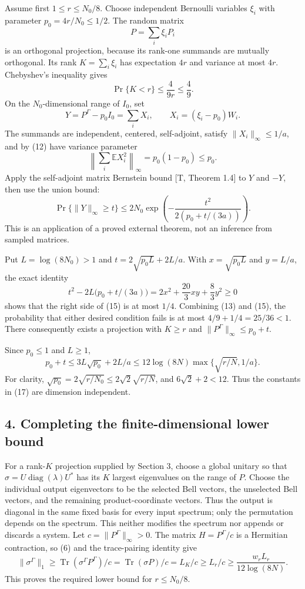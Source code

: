 \documentclass[11pt]{article}
\begin{document}
Assume first \(1\le r\le N_0/8\). Choose independent Bernoulli variables \(\xi_i\) with parameter \(p_0=4r/N_0\le1/2\). The random matrix \[
 P=\sum_i\xi_iP_i
\] is an orthogonal projection, because its rank-one summands are mutually orthogonal. Its rank \(K=\sum_i\xi_i\) has expectation \(4r\) and variance at most \(4r\). Chebyshev's inequality gives \[
 \Pr\{K<r\}\le\frac4{9r}\le\frac49.
 \tag{13}
\] On the \(N_0\)-dimensional range of \(I_0\), set \[
 Y=P^\Gamma-p_0I_0=\sum_iX_i,\qquad X_i=(\xi_i-p_0)W_i.
\] The summands are independent, centered, self-adjoint, satisfy \(\|X_i\|_\infty\le1/a\), and by (12) have variance parameter \[
 \left\|\sum_i\mathbb E X_i^2\right\|_\infty
 =p_0(1-p_0)\le p_0.
 \tag{14}
\] Apply the self-adjoint matrix Bernstein bound {[}T, Theorem 1.4{]} to \(Y\) and \(-Y\), then use the union bound: \[
 \Pr\{\|Y\|_\infty\ge t\}
 \le 2N_0\exp\left(-\frac{t^2}{2(p_0+t/(3a))}\right).
 \tag{15}
\] This is an application of a proved external theorem, not an inference from sampled matrices.

Put \(L=\log(8N_0)>1\) and \(t=2\sqrt{p_0L}+2L/a\). With \(x=\sqrt{p_0L}\) and \(y=L/a\), the exact identity \[
 t^2-2L\bigl(p_0+t/(3a)\bigr)
 =2x^2+\frac{20}3xy+\frac83y^2\ge0
 \tag{16}
\] shows that the right side of (15) is at most \(1/4\). Combining (13) and (15), the probability that either desired condition fails is at most \(4/9+1/4=25/36<1\). There consequently exists a projection with \(K\ge r\) and \(\|P^\Gamma\|_\infty\le p_0+t\).

Since \(p_0\le1\) and \(L\ge1\), \[
 p_0+t\le 3L\sqrt{p_0}+2L/a
 \le 12\log(8N)\max\{\sqrt{r/N},1/a\}.
 \tag{17}
\] For clarity, \(\sqrt{p_0}=2\sqrt{r/N_0}\le2\sqrt2\sqrt{r/N}\), and \(6\sqrt2+2<12\). Thus the constants in (17) are dimension independent.

\hypertarget{completing-the-finite-dimensional-lower-bound}{%
\subsection{4. Completing the finite-dimensional lower bound}\label{completing-the-finite-dimensional-lower-bound}}

For a rank-\(K\) projection supplied by Section 3, choose a global unitary so that \(\sigma=U\operatorname{diag}(\lambda)U^*\) has its \(K\) largest eigenvalues on the range of \(P\). Choose the individual output eigenvectors to be the selected Bell vectors, the unselected Bell vectors, and the remaining product-coordinate vectors. Thus the output is diagonal in the same fixed basis for every input spectrum; only the permutation depends on the spectrum. This neither modifies the spectrum nor appends or discards a system. Let \(c=\|P^\Gamma\|_\infty>0\). The matrix \(H=P^\Gamma/c\) is a Hermitian contraction, so (6) and the trace-pairing identity give \[
 \|\sigma^\Gamma\|_1
 \ge\operatorname{Tr}(\sigma^\Gamma P^\Gamma)/c
 =\operatorname{Tr}(\sigma P)/c
 =L_K/c\ge L_r/c
 \ge\frac{w_rL_r}{12\log(8N)}.
 \tag{18}
\] This proves the required lower bound for \(r\le N_0/8\).
\end{document}
